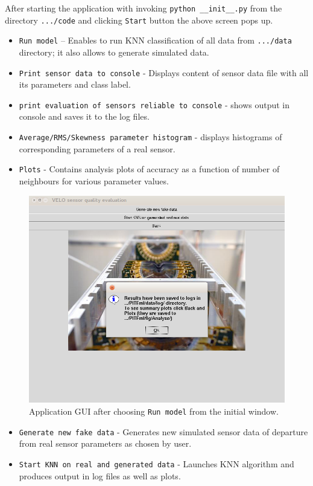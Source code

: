 \documentclass[a4paper,10pt]{article}
\begin{document}
After starting the application with invoking \texttt{python \_\_init\_\_.py} from the directory \texttt{.../code} and clicking \texttt{Start} button the above screen pops up.
\begin{itemize}
    \item \texttt{Run model} -- Enables to run KNN classification of all data from \texttt{.../data} directory; it also allows to generate simulated data.
    \item \texttt{Print sensor data to console} - Displays content of sensor data file with all its parameters and class label.
    \item \texttt{print evaluation of sensors reliable to console} - shows output in console and saves it to the log files.
    \item \texttt{Average/RMS/Skewness parameter histogram} - displays histograms of corresponding parameters of a real sensor.
    \item \texttt{Plots} - Contains analysis plots of accuracy as a function of number of neighbours for various parameter values.
\end{itemize}

\begin{figure}[H] \centering
    \includegraphics[width=.8\textwidth]{../fig/app_shots/model}
    \caption{Application GUI after choosing \texttt{Run model} from the initial window.}
\end{figure}

\begin{itemize}
    \item \texttt{Generate new fake data} - Generates new simulated sensor data of departure from real sensor parameters as chosen by user.
    \item \texttt{Start KNN on real and generated data} - Launches KNN algorithm and produces output in log files as well as plots.
\end{itemize}
\end{document}
